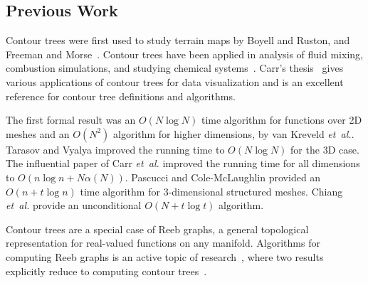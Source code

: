 \documentclass[11pt]{article}
\theoremstyle{definition}
\newcommand{\cC}{{\cal C}}
\newcommand{\MM}{\mathbb{M}}
\newcommand{\Sec}[1]{\hyperref[sec:#1]{\S\ref*{sec:#1}}} %
\newcommand{\etal}{\textit{et~al.}\xspace}
\begin{document}
\subsection{Previous Work}

Contour trees were first used to study terrain maps by Boyell and Ruston, and Freeman and Morse~\cite{BoRu63,FrMo67}.
Contour trees have been applied in analysis of fluid mixing, combustion simulations,
and studying chemical systems~\cite{LaBe+06,BrWe+10,BeWe+11,BrWe+11,MaGr+11}. Carr's thesis~\cite{c-tmi-04} gives various
applications of contour trees for data visualization and is an excellent reference for contour tree definitions and algorithms.

The first formal result was an $O(N\log N)$ time algorithm for functions over 2D 
meshes and an $O(N^2)$ algorithm for higher dimensions, by van Kreveld \etal \cite{kobps-ctsssit-97}. 
Tarasov and Vyalya \cite{tv-cct-98} improved the running time to $O(N\log N)$ for the 3D case.
The influential paper of Carr \etal \cite{csa-cctad-03} improved the running time for all dimensions to $O(n\log n + N\alpha(N))$.
Pascucci and Cole-McLaughlin \cite{pc-ectls-02} provided an $O(n+t\log n)$ time algorithm for 
$3$-dimensional structured meshes. Chiang \etal \cite{cllr-sooscctmp-05} provide an unconditional $O(N+t\log t)$ algorithm.

Contour trees are a special case of Reeb graphs, a general topological representation for real-valued functions
on any manifold. Algorithms for computing Reeb graphs
is an active topic of research~\cite{sk-crgacs-91,cehnp-lrbm-03,PaScBr07,DoNa09,HaWaWe10,Pa12}, where
two results explicitly reduce to computing contour trees~\cite{TiGySi09,DoNa13}.


\end{document}
